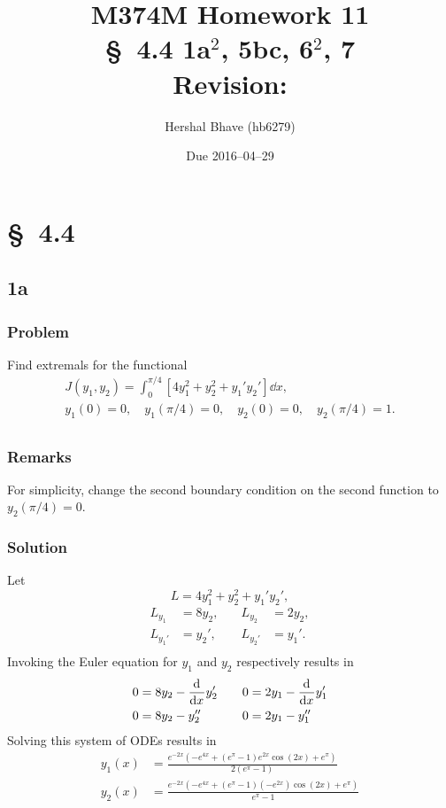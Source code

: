 \documentclass[12pt,twoside]{article}
\title{M374M Homework 11 \\
  \normalsize{\S~4.4 1a$^2$, 5bc, 6$^2$, 7} \\
  Revision: }
\author{Hershal Bhave (hb6279)}
\date{Due 2016--04--29}
\begin{document}
\maketitle

\section{\S~4.4}
\subsection{1a}
\subsubsection*{Problem}
Find extremals for the functional
\begin{equation}
  \label{eq:1a-problem}
  \begin{aligned}
    J(y_1, y_2)=\int_0^{\pi/4}[4y_1^2+y_2^2+y_1'y_2']\dd{x}, \\
    y_1(0)=0, \quad y_1(\pi/4)=0,\quad y_2(0)=0,\quad y_2(\pi/4)=1. \\
  \end{aligned}
\end{equation}

\subsubsection*{Remarks}
For simplicity, change the second boundary condition on the second function to
$y_2(\pi/4)=0$.

\subsubsection*{Solution}
Let
$$L = 4y_1^2 + y_2^2 + y_1'y_2',$$
\begin{align*}
  L_{y_1} &= 8 y_2, &\quad L_{y_2} &= 2 y_2, \\
  L_{y_1'} &= y_2', &\quad L_{y_2'} &= y_1'. \\
\end{align*}
Invoking the Euler equation for $y_1$ and $y_2$ respectively results in
\begin{align*}
  0 &= 8 y_2 - \frac{\mathrm{d}^{} {}}{\mathrm{d}{x}^{}} y_2' &\quad 0 &= 2y_1 - \frac{\mathrm{d}^{} {}}{\mathrm{d}{x}^{}} y_1' \\
  0 &= 8 y_2 - y_2'' &\quad 0 &= 2y_1 - y_1'' \\
\end{align*}
Solving this system of ODEs results in
\begin{equation*}
  \boxed{
    \begin{aligned}
      y_1(x) &= \frac{e^{-2 x} \left(-e^{4 x}+\left(e^{\pi }-1\right) e^{2 x} \cos (2 x)+e^{\pi }\right)}{2 \left(e^{\pi }-1\right)} \\
      y_2(x) &= \frac{e^{-2 x} \left(-e^{4 x}+\left(e^{\pi }-1\right) \left(-e^{2
              x}\right) \cos (2 x)+e^{\pi }\right)}{e^{\pi }-1}
    \end{aligned}
  }
\end{equation*}
\end{document}
